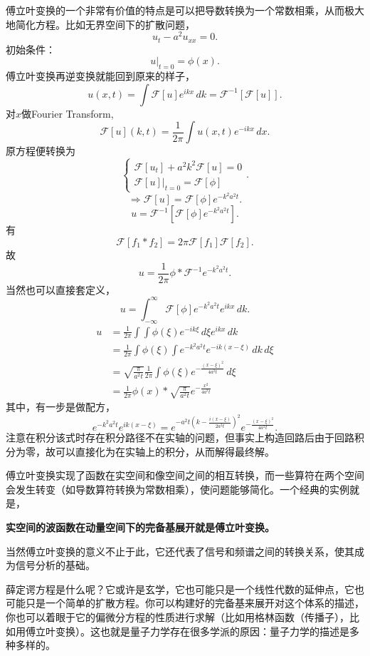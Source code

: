 \documentclass[12pt,a4paper,openany,twoside]{book}
\numberwithin{equation}{section}
\begin{document}
傅立叶变换的一个非常有价值的特点是可以把导数转换为一个常数相乘，从而极大地简化方程。比如无界空间下的扩散问题，
\[
  u_t-a^2u_{xx} = 0
.\] 
初始条件：
\[
  u\big|_{t=0} = \phi(x)
.\] 
傅立叶变换再逆变换就能回到原来的样子，
\[
  u(x,t) = \int \mathcal{F}[u] e^{ikx} \, dk = \mathcal{F}^{-1}[\mathcal{F}[u]]
.\] 
对$x$做Fourier Transform,
\[
  \mathcal{F}[u](k,t) = \frac{1}{2\pi} \int u(x,t) e^{-ikx} \, dx 
.\] 
原方程便转换为
\[
\begin{cases}
  \mathcal{F}[u_t] + a^2 k^2 \mathcal{F}[u] = 0 \\
  \mathcal{F}[u]\big|_{t=0} = \mathcal{F}[\phi]
\end{cases}
.\] 
\[
  \Rightarrow \mathcal{F}[u] = \mathcal{F}[\phi] e^{-k^2 a^2 t}
.\] 
\[
  u = \mathcal{F}^{-1} [\mathcal{F}[\phi] e^{-k^2a^2 t}]
.\] 
有
\[
  \mathcal{F}[f_1 * f_2] = 2\pi \mathcal{F}[f_1] \mathcal{F} [f_2]
.\] 
故
\[
  u = \frac{1}{2\pi} \phi * \mathcal{F}^{-1} e^{-k^2 a^2 t} 
.\] 
当然也可以直接套定义，
\[
  u = \int_{-\infty} ^\infty \mathcal{F}[\phi] e^{-k^2 a^2 t} e^{ikx} \, dk 
.\] 
\begin{align*}
  u &= \frac{1}{2\pi}\int \int \phi(\xi) e^{-ik\xi} \, d\xi e^{ikx}  \, dk\\
    &=\frac{1}{2\pi} \int \phi(\xi) \int e^{-k^2 a^2 t} e^{-ik(x-\xi)} \, dk  \, d\xi \\
    &=\sqrt{\frac{\pi}{a^2 t}}\frac{1}{2\pi} \int \phi(\xi) e^{-\frac{(x-\xi)^2}{4a^2 t}} \, d\xi\\
    &=\frac{1}{2\pi} \phi(x) * \sqrt{\frac{\pi}{a^2 t}} e^{-\frac{x^2}{4 a^2 t}}
\end{align*}
其中，有一步是做配方，
\[
  e^{-k^2a^2 t} e^{ik (x-\xi)} = e^{-a^2 t (k-\frac{i (x-\xi)}{2a^2 t})^2} e^{-\frac{(x-\xi)^2}{4a^2 t}}
.\] 
注意在积分该式时存在积分路径不在实轴的问题，但事实上构造回路后由于回路积分为零，故可以直接化为在实轴上的积分，从而解得最终解。

傅立叶变换实现了函数在实空间和像空间之间的相互转换，而一些算符在两个空间会发生转变（如导数算符转换为常数相乘），使问题能够简化。一个经典的实例就是，
\begin{center}
  \textbf{实空间的波函数在动量空间下的完备基展开就是傅立叶变换。}
\end{center}
当然傅立叶变换的意义不止于此，它还代表了信号和频谱之间的转换关系，使其成为信号分析的基础。

薛定谔方程是什么呢？它或许是玄学，它也可能只是一个线性代数的延伸点，它也可能只是一个简单的扩散方程。你可以构建好的完备基来展开对这个体系的描述，你也可以着眼于它的偏微分方程的性质进行求解（比如用格林函数（传播子），比如用傅立叶变换）。这也就是量子力学存在很多学派的原因：量子力学的描述是多种多样的。
\end{document}
